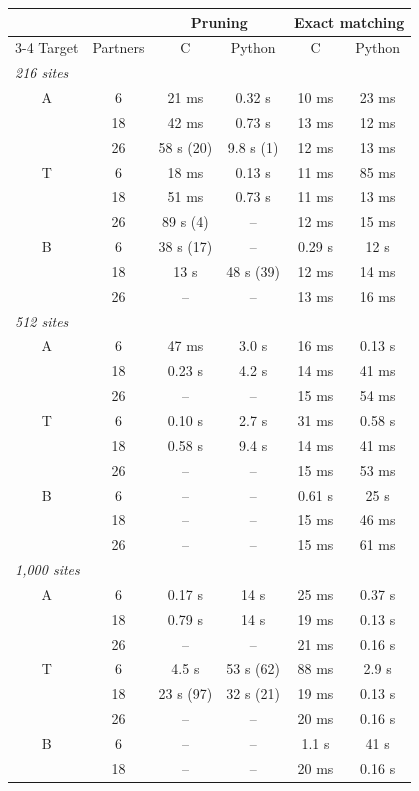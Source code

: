 \begin{tabular}{cccccc}
\hline
 & & \multicolumn{2}{c}{Pruning} & \multicolumn{2}{c}{Exact matching} \\
\cline{3-4}\cline{5-6}
Target & Partners & C & Python & C & Python \\
\hline
\multicolumn{6}{l}{\textit{216 sites}} \\
A & 6 & 21 ms & 0.32 s & 10 ms & 23 ms \\
 & 18 & 42 ms & 0.73 s & 13 ms & 12 ms \\
 & 26 & 58 s (20) & 9.8 s (1) & 12 ms & 13 ms \\
T & 6 & 18 ms & 0.13 s & 11 ms & 85 ms \\
 & 18 & 51 ms & 0.73 s & 11 ms & 13 ms \\
 & 26 & 89 s (4) & -- & 12 ms & 15 ms \\
B & 6 & 38 s (17) & -- & 0.29 s & 12 s \\
 & 18 & 13 s & 48 s (39) & 12 ms & 14 ms \\
 & 26 & -- & -- & 13 ms & 16 ms \\
\hline
\multicolumn{6}{l}{\textit{512 sites}} \\
A & 6 & 47 ms & 3.0 s & 16 ms & 0.13 s \\
 & 18 & 0.23 s & 4.2 s & 14 ms & 41 ms \\
 & 26 & -- & -- & 15 ms & 54 ms \\
T & 6 & 0.10 s & 2.7 s & 31 ms & 0.58 s \\
 & 18 & 0.58 s & 9.4 s & 14 ms & 41 ms \\
 & 26 & -- & -- & 15 ms & 53 ms \\
B & 6 & -- & -- & 0.61 s & 25 s \\
 & 18 & -- & -- & 15 ms & 46 ms \\
 & 26 & -- & -- & 15 ms & 61 ms \\
\hline
\multicolumn{6}{l}{\textit{1,000 sites}} \\
A & 6 & 0.17 s & 14 s & 25 ms & 0.37 s \\
 & 18 & 0.79 s & 14 s & 19 ms & 0.13 s \\
 & 26 & -- & -- & 21 ms & 0.16 s \\
T & 6 & 4.5 s & 53 s (62) & 88 ms & 2.9 s \\
 & 18 & 23 s (97) & 32 s (21) & 19 ms & 0.13 s \\
 & 26 & -- & -- & 20 ms & 0.16 s \\
B & 6 & -- & -- & 1.1 s & 41 s \\
 & 18 & -- & -- & 20 ms & 0.16 s \\

\end{tabular}
